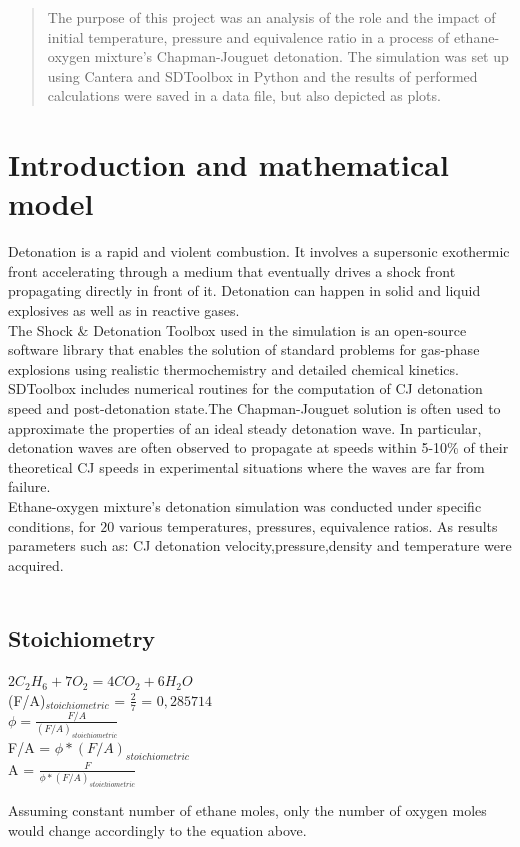 \documentclass[a4paper]{article}
\date{}
\begin{document}

\newpage


\begin{abstract}
    The purpose of this project was an analysis of the role and the impact of initial temperature, pressure and equivalence ratio in a process of ethane-oxygen mixture's Chapman-Jouguet detonation. The simulation was set up using Cantera and SDToolbox in Python and the results of performed calculations were saved in a data file, but also depicted as plots.
\end{abstract}
\section{Introduction and mathematical model}
Detonation is a rapid and violent combustion. It involves a supersonic exothermic front accelerating through a medium that eventually drives a shock front propagating directly in front of it. Detonation can happen in solid and liquid explosives as well as in reactive gases.\\
The Shock \& Detonation Toolbox used in the simulation is an open-source software library that enables the solution of standard problems for gas-phase explosions using realistic thermochemistry and detailed chemical kinetics. SDToolbox includes numerical routines for the computation of CJ detonation speed and post-detonation state.The Chapman-Jouguet solution is often used to approximate the properties of an ideal steady detonation wave. In particular, detonation waves are often observed to propagate at speeds within 5-10\% of their theoretical CJ speeds in experimental situations where the waves are far from failure.\\
Ethane-oxygen mixture's detonation simulation was conducted under specific conditions, for $20$ various temperatures, pressures, equivalence ratios. As results parameters such as: CJ detonation velocity,pressure,density and temperature were acquired.\\\\
\subsection{Stoichiometry}
\begin{center}
    $2C_2H_6 +7O_2=4CO_2+6H_2O$\\
    \bigskip
   (F/A)$_{stoichiometric}$ = \( \frac{2}{7} \) = $0,285714$\\
   \bigskip
   $\phi =  \frac{F/A}{(F/A)_{stoichiometric}}$\\
   \bigskip
   F/A = $\phi*(F/A)_{stoichiometric}$\\
   \bigskip
   A = $\frac{F}{\phi*(F/A)_{stoichiometric}}$
\end{center}
Assuming constant number of ethane moles, only the number of oxygen moles would change accordingly to the equation above.     
\end{document}
